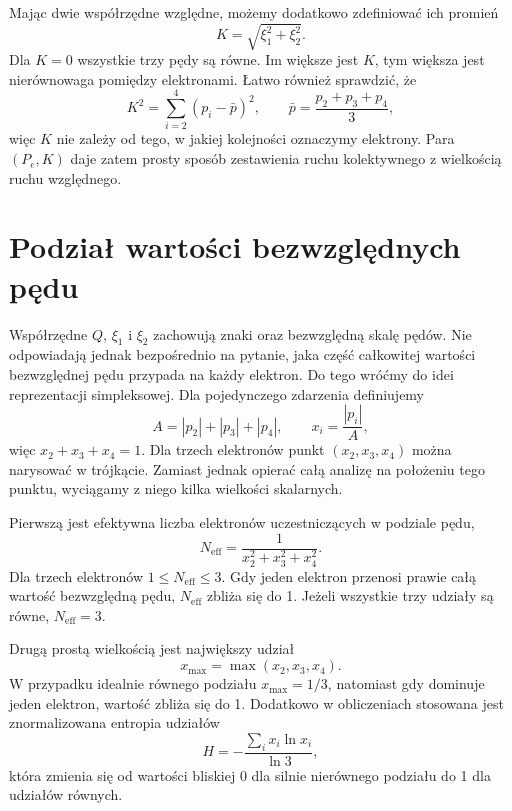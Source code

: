 \documentclass[12pt,letterpaper,oneside]{report}
\numberwithin{equation}{chapter}
\numberwithin{figure}{chapter}
\numberwithin{table}{chapter}
\begin{document}
Mając dwie współrzędne względne, możemy dodatkowo zdefiniować ich promień
\begin{equation}
K=\sqrt{\xi_1^2+\xi_2^2}.
\label{eq:K}
\end{equation}
Dla $K=0$ wszystkie trzy pędy są równe. Im większe jest $K$, tym większa jest nierównowaga pomiędzy elektronami. Łatwo również sprawdzić, że
\begin{equation}
K^2=\sum_{i=2}^{4}(p_i-\bar p)^2,
\qquad
\bar p=\frac{p_2+p_3+p_4}{3},
\label{eq:Kvariance}
\end{equation}
więc $K$ nie zależy od tego, w jakiej kolejności oznaczymy elektrony. Para $(P_e,K)$ daje zatem prosty sposób zestawienia ruchu kolektywnego z wielkością ruchu względnego.

\section{Podział wartości bezwzględnych pędu}

Współrzędne $Q$, $\xi_1$ i $\xi_2$ zachowują znaki oraz bezwzględną skalę pędów. Nie odpowiadają jednak bezpośrednio na pytanie, jaka część całkowitej wartości bezwzględnej pędu przypada na każdy elektron. Do tego wróćmy do idei reprezentacji simpleksowej. Dla pojedynczego zdarzenia definiujemy
\begin{equation}
A=|p_2|+|p_3|+|p_4|,
\qquad
x_i=\frac{|p_i|}{A},
\label{eq:shares}
\end{equation}
więc $x_2+x_3+x_4=1$. Dla trzech elektronów punkt $(x_2,x_3,x_4)$ można narysować w trójkącie. Zamiast jednak opierać całą analizę na położeniu tego punktu, wyciągamy z niego kilka wielkości skalarnych.

Pierwszą jest efektywna liczba elektronów uczestniczących w podziale pędu,
\begin{equation}
N_{\mathrm{eff}}=\frac{1}{x_2^2+x_3^2+x_4^2}.
\label{eq:Neff}
\end{equation}
Dla trzech elektronów $1\le N_{\mathrm{eff}}\le3$. Gdy jeden elektron przenosi prawie całą wartość bezwzględną pędu, $N_{\mathrm{eff}}$ zbliża się do 1. Jeżeli wszystkie trzy udziały są równe, $N_{\mathrm{eff}}=3$.

Drugą prostą wielkością jest największy udział
\begin{equation}
x_{\max}=\max(x_2,x_3,x_4).
\label{eq:xmax}
\end{equation}
W przypadku idealnie równego podziału $x_{\max}=1/3$, natomiast gdy dominuje jeden elektron, wartość zbliża się do 1. Dodatkowo w obliczeniach stosowana jest znormalizowana entropia udziałów
\begin{equation}
H=-\frac{\sum_i x_i\ln x_i}{\ln3},
\label{eq:entropy}
\end{equation}
która zmienia się od wartości bliskiej 0 dla silnie nierównego podziału do 1 dla udziałów równych.
\end{document}
